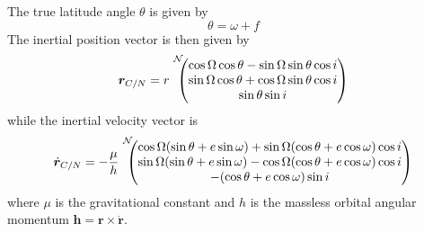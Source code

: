 The true latitude angle $\theta$ is given by
\begin{equation}
	\theta = \omega + f
\end{equation}
The inertial position vector is then given by\cite{schaub}
\begin{equation}
\bm r_{C/N} =r {\begin{matrix} ~ \\ ~ \\ ~
\end{matrix}}^{\cal N}\!\!\!\!  \begin{pmatrix}
\cos\Omega\cos\theta 
- \sin\Omega\sin\theta\cos i \\ 
\sin\Omega\cos\theta + \cos\Omega\sin\theta\cos 
i \\
 \sin\theta\sin i 
 \end{pmatrix}
\label{eq:tb:r2}
\end{equation}
while the inertial velocity vector is
\begin{equation}
\dot{\bm r}_{C/N} = -\frac{\mu}{h}
{\begin{matrix} ~ \\ ~ \\ ~
\end{matrix}}^{\cal N}\!\!\!\!  \begin{pmatrix}
\cos\Omega (\sin\theta + e\sin\omega ) + \sin\Omega 
(\cos\theta+e\cos\omega )\cos i \\
\sin\Omega (\sin\theta + e\sin\omega ) - \cos\Omega ( \cos\theta 
+ e\cos\omega )\cos i \\
-(\cos\theta + e\cos\omega )\sin i
\end{pmatrix}
\label{eq:tb:dr2}
\end{equation}
where $\mu$ is the gravitational constant and $h$ is the massless orbital angular momentum $\bm h = \bm r \times \dot{\bm r}$.  


